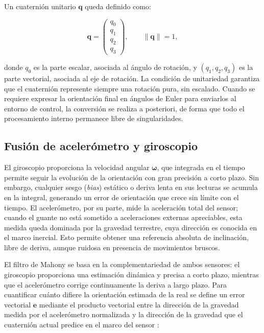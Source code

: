 \documentclass[12pt]{article}
\begin{document}
Un cuaternión unitario $\mathbf{q}$ queda definido como:

\begin{equation}
\mathbf{q} =
\begin{pmatrix}
q_0 \\ q_1 \\ q_2 \\ q_3
\end{pmatrix},
\qquad \|\mathbf{q}\|=1,
\end{equation}

donde $q_0$ es la parte escalar, asociada al ángulo de rotación, y
$(q_1, q_2, q_3)$ es la parte vectorial, asociada al eje de rotación. La condición de unitariedad garantiza que el cuaternión represente siempre una rotación pura, sin escalado. Cuando se requiere expresar la orientación final en ángulos de Euler para enviarlos al entorno de control, la conversión se realiza a posteriori, de forma que todo el procesamiento interno permanece libre de singularidades.

\subsection{Fusión de acelerómetro y giroscopio}

El giroscopio proporciona la velocidad angular $\boldsymbol{\omega}$, que integrada en el tiempo permite seguir la evolución de la orientación con gran precisión a corto plazo.
Sin embargo, cualquier sesgo (\textit{bias}) estático o deriva lenta en sus lecturas se acumula en la integral, generando un error de orientación que crece sin límite con el tiempo. El acelerómetro, por su parte, mide la aceleración total del sensor; cuando el guante no está sometido a aceleraciones externas apreciables, esta medida queda dominada por la gravedad terrestre, cuya dirección es conocida en el marco inercial. Esto permite obtener una referencia absoluta de inclinación, libre de deriva, aunque ruidosa en presencia de movimientos bruscos.

El filtro de Mahony se basa en la complementariedad de ambos sensores: el giroscopio proporciona una estimación dinámica y precisa a corto plazo, mientras que el acelerómetro corrige continuamente la deriva a largo plazo. Para cuantificar cuánto difiere la orientación estimada de la real se define un error vectorial $\mathbf{e}$ mediante el producto vectorial entre la dirección de la gravedad medida por el acelerómetro normalizada y la dirección de la gravedad que el cuaternión actual predice en el marco del sensor \cite{Mahony2008}:
\end{document}
